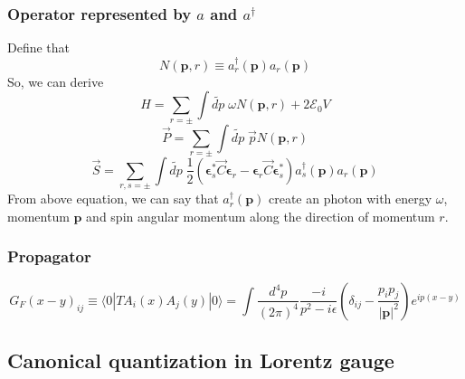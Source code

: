 \subsubsection{Operator represented by $a$ and $a^{\dagger}$}
\noindent
Define that
\[N(\bm{p},r) \equiv a^{\dagger}_{r}(\bm{p}) a_r(\bm{p})\]
So, we can derive
\[H = \sum_{r = \pm} \int \widetilde{dp} \; \omega N(\bm{p},r) + 2\mathcal{E}_0V\]
\[\vec{P} = \sum_{r = \pm} \int \widetilde{dp} \; \vec{p} N(\bm{p},r) \]
\[\vec{S} = \sum_{r,s = \pm} \int \widetilde{dp} \; \frac{1}{2}(\bm{\epsilon}^*_{s} \vec{C}\bm{\epsilon}_{r} - \bm{\epsilon}_{r} \vec{C}\bm{\epsilon}^*_{s}) a^{\dagger}_{s}(\bm{p}) a_r(\bm{p})\]
From above equation, we can say that $a^{\dagger}_r(\bm{p})$ create an photon with energy $\omega$, momentum $\bm{p}$ and spin angular momentum along the direction of momentum $r$.

\subsubsection{Propagator}
\[G_F(x-y)_{ij} \equiv \langle 0 |T A_i(x) A_j(y) | 0 \rangle = \int \frac{d^4p}{(2\pi)^4} \frac{-i}{p^2-i\epsilon} \left(\delta_{ij} - \frac{p_ip_j}{|\bm{p}|^2}\right) e^{ip(x-y)}\]

\subsection{Canonical quantization in Lorentz gauge}
